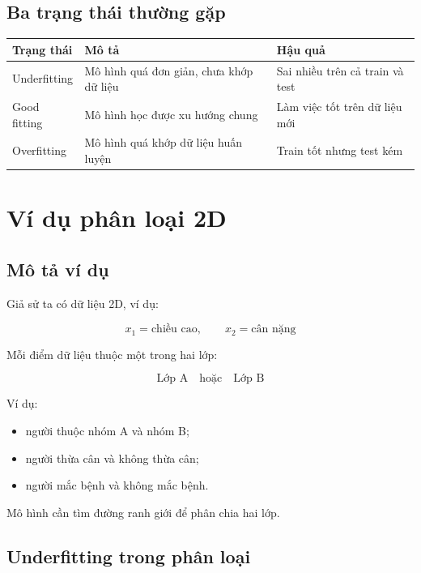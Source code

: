 \documentclass[12pt,a4paper]{report}
\begin{document}
\section{Ba trạng thái thường gặp}

\begin{center}
\begin{tabular}{p{}p{}p{}}
\toprule
Trạng thái & Mô tả & Hậu quả \\
\midrule
Underfitting & Mô hình quá đơn giản, chưa khớp dữ liệu & Sai nhiều trên cả train và test \\
Good fitting & Mô hình học được xu hướng chung & Làm việc tốt trên dữ liệu mới \\
Overfitting & Mô hình quá khớp dữ liệu huấn luyện & Train tốt nhưng test kém \\
\bottomrule
\end{tabular}
\end{center}

\chapter{Ví dụ phân loại 2D}

\section{Mô tả ví dụ}

Giả sử ta có dữ liệu 2D, ví dụ:

\[
    x_1 = \text{chiều cao}, \qquad x_2 = \text{cân nặng}
\]

Mỗi điểm dữ liệu thuộc một trong hai lớp:

\[
    \text{Lớp A} \quad \text{hoặc} \quad \text{Lớp B}
\]

Ví dụ:

\begin{itemize}
    \item người thuộc nhóm A và nhóm B;
    \item người thừa cân và không thừa cân;
    \item người mắc bệnh và không mắc bệnh.
\end{itemize}

Mô hình cần tìm đường ranh giới để phân chia hai lớp.

\section{Underfitting trong phân loại}
\end{document}
